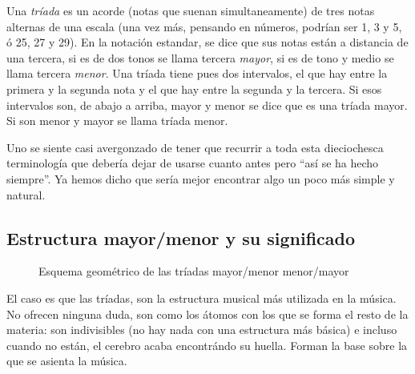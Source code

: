 \documentclass[]{article}
\begin{document}
Una \emph{tríada} es un acorde (notas que suenan simultaneamente) de tres notas alternas de una escala (una vez más, pensando en números, podrían ser 1, 3 y 5, ó 25, 27 y 29). En la notación estandar, se dice que sus notas están a distancia de una tercera, si es de dos tonos se llama tercera \emph{mayor}, si es de tono y medio se llama tercera \emph{menor}. Una tríada tiene pues dos intervalos, el que hay entre la primera y la segunda nota y el que hay entre la segunda y la tercera. Si esos intervalos son, de abajo a arriba, mayor y menor se dice que es una tríada mayor. Si son menor y mayor se llama tríada menor.

Uno se siente casi avergonzado de tener que recurrir a toda esta dieciochesca terminología que debería dejar de usarse cuanto antes pero ``así se ha hecho siempre''. Ya hemos dicho que sería mejor encontrar algo un poco más simple y natural.

\subsection{Estructura mayor/menor y su significado}

\begin{figure}[htbp]
  \center%
    \vspace{12pt}
  \caption{Esquema geométrico de las tríadas mayor/menor menor/mayor}\label{fig:maj-minor-scheme}
 \end{figure}
 
El caso es que las tríadas, son la estructura musical más utilizada en la música. No ofrecen ninguna duda, son como los átomos con los que se forma el resto de la materia: son indivisibles (no hay nada con una estructura más básica) e incluso cuando no están, el cerebro acaba encontrándo su huella. Forman la base sobre la que se asienta la música.
\end{document}
